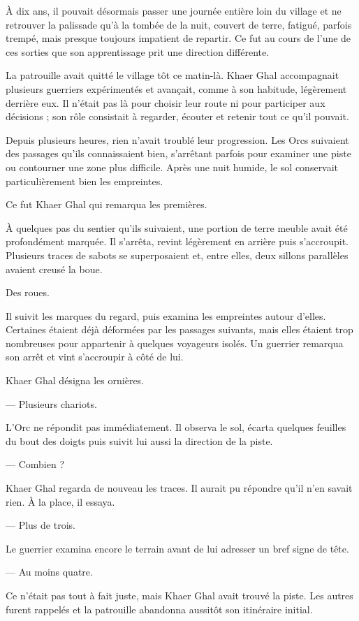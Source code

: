 À dix ans, il pouvait désormais passer une journée entière loin du village et
ne retrouver la palissade qu'à la tombée de la nuit, couvert de terre,
fatigué, parfois trempé, mais presque toujours impatient de repartir. Ce fut au
cours de l'une de ces sorties que son apprentissage prit une direction
différente.

La patrouille avait quitté le village tôt ce matin-là. Khaer Ghal accompagnait
plusieurs guerriers expérimentés et avançait, comme à son habitude, légèrement
derrière eux. Il n'était pas là pour choisir leur route ni pour participer aux
décisions ; son rôle consistait à regarder, écouter et retenir tout ce qu'il
pouvait.

Depuis plusieurs heures, rien n'avait troublé leur progression. Les Orcs
suivaient des passages qu'ils connaissaient bien, s'arrêtant parfois pour
examiner une piste ou contourner une zone plus difficile. Après une nuit
humide, le sol conservait particulièrement bien les empreintes.

Ce fut Khaer Ghal qui remarqua les premières.

À quelques pas du sentier qu'ils suivaient, une portion de terre meuble avait
été profondément marquée. Il s'arrêta, revint légèrement en arrière puis
s'accroupit. Plusieurs traces de sabots se superposaient et, entre elles, deux
sillons parallèles avaient creusé la boue.

Des roues.

Il suivit les marques du regard, puis examina les empreintes autour d'elles.
Certaines étaient déjà déformées par les passages suivants, mais elles étaient
trop nombreuses pour appartenir à quelques voyageurs isolés. Un guerrier
remarqua son arrêt et vint s'accroupir à côté de lui.

Khaer Ghal désigna les ornières.

— Plusieurs chariots.

L'Orc ne répondit pas immédiatement. Il observa le sol, écarta quelques
feuilles du bout des doigts puis suivit lui aussi la direction de la piste.

— Combien ?

Khaer Ghal regarda de nouveau les traces. Il aurait pu répondre qu'il n'en
savait rien. À la place, il essaya.

— Plus de trois.

Le guerrier examina encore le terrain avant de lui adresser un bref signe de
tête.

— Au moins quatre.

Ce n'était pas tout à fait juste, mais Khaer Ghal avait trouvé la piste. Les
autres furent rappelés et la patrouille abandonna aussitôt son itinéraire
initial.

